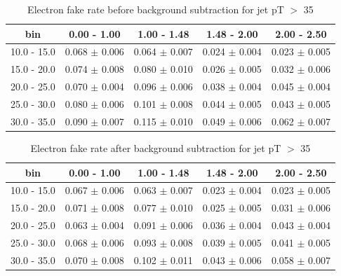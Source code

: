 %
%

\begin{table}[!ht]
{\small
\begin{center}
\begin{tabular}{c|c|c|c|c}
\hline
bin &  0.00 - 1.00  &   1.00 - 1.48  &   1.48 - 2.00  &   2.00 - 2.50 \\
\hline
  10.0 - 15.0  &    0.068 $\pm$ 0.006 &     0.064 $\pm$ 0.007 &     0.024 $\pm$ 0.004 &     0.023 $\pm$ 0.005 \\
  15.0 - 20.0  &    0.074 $\pm$ 0.008 &     0.080 $\pm$ 0.010 &     0.026 $\pm$ 0.005 &     0.032 $\pm$ 0.006 \\
  20.0 - 25.0  &    0.070 $\pm$ 0.004 &     0.096 $\pm$ 0.006 &     0.038 $\pm$ 0.004 &     0.045 $\pm$ 0.004 \\
  25.0 - 30.0  &    0.080 $\pm$ 0.006 &     0.101 $\pm$ 0.008 &     0.044 $\pm$ 0.005 &     0.043 $\pm$ 0.005 \\
  30.0 - 35.0  &    0.090 $\pm$ 0.007 &     0.115 $\pm$ 0.010 &     0.049 $\pm$ 0.006 &     0.062 $\pm$ 0.007 \\
\hline
\end{tabular}
\caption{Electron fake rate before background subtraction for jet pT $>$ 35}
\label{tab:elfake_raw}
\end{center}}
\end{table}
\begin{table}[!ht]
{\small
\begin{center}
\begin{tabular}{c|c|c|c|c}
\hline
bin &  0.00 - 1.00  &   1.00 - 1.48  &   1.48 - 2.00  &   2.00 - 2.50 \\
\hline
  10.0 - 15.0  &    0.067 $\pm$ 0.006 &     0.063 $\pm$ 0.007 &     0.023 $\pm$ 0.004 &     0.023 $\pm$ 0.005 \\
  15.0 - 20.0  &    0.071 $\pm$ 0.008 &     0.077 $\pm$ 0.010 &     0.025 $\pm$ 0.005 &     0.031 $\pm$ 0.006 \\
  20.0 - 25.0  &    0.063 $\pm$ 0.004 &     0.091 $\pm$ 0.006 &     0.036 $\pm$ 0.004 &     0.043 $\pm$ 0.004 \\
  25.0 - 30.0  &    0.068 $\pm$ 0.006 &     0.093 $\pm$ 0.008 &     0.039 $\pm$ 0.005 &     0.041 $\pm$ 0.005 \\
  30.0 - 35.0  &    0.070 $\pm$ 0.008 &     0.102 $\pm$ 0.011 &     0.043 $\pm$ 0.006 &     0.058 $\pm$ 0.007 \\
\hline
\end{tabular}
\caption{Electron fake rate after background subtraction for jet pT $>$ 35}
\label{tab:elfake_cor}
\end{center}}
\end{table}

